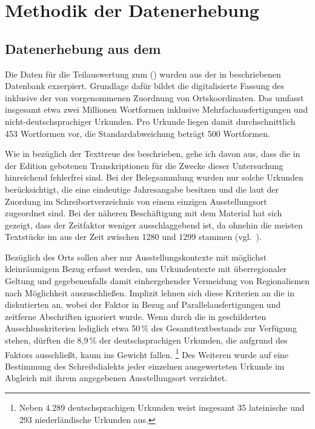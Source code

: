 \chapter{Methodik der Datenerhebung}
\label{ch:methoden}

\section%
	{Datenerhebung aus dem }
\label{sec:miningcao}

Die Daten für die Teilauswertung zum  (\CAO) wurden aus der in
\textcites[207]{beckerschallert2021}[155--158]{beckerschallert2022b}
beschriebenen Datenbank exzerpiert. Grundlage dafür bildet die digitalisierte
Fassung des \CAO{} \autocites{cao-online}[vgl.~dazu][]{gniffkerapp2005}
inklusive der von \citeauthor{beckerschallert2022b} vorgenommenen Zuordnung von
Ortskoordinaten. Das \CAO{} umfasst insgesamt etwa zwei Millionen Wortformen
inklusive Mehrfachausfertigungen und nicht-deutschsprachiger Urkunden. Pro
Urkunde liegen damit durchschnittlich 453 Wortformen vor, die
Standardabweichung beträgt 500 Wortformen.

Wie in  bezüglich der Text\-treue des \CAO{} beschrieben,
gehe ich davon aus, dass die in der Edition gebotenen Transkriptionen für die
Zwecke dieser Untersuchung hinreichend fehlerfrei sind. Bei der Belegsammlung
wurden nur solche Urkunden berücksichtigt, die eine eindeutige Jahresangabe
besitzen und die laut der Zuordung im Schreibortverzeichnis von
\citet{cao-online} einem einzigen Ausstellungsort zugeordnet sind. Bei der
näheren Beschäftigung mit dem Material hat sich gezeigt, dass der Zeitfaktor
weniger ausschlaggebend ist, da ohnehin die meisten Textstücke im \CAO{} aus
der Zeit zwischen 1280 und 1299 stammen (vgl.~).

Bezüglich des Orts sollen aber nur Ausstellungs\-kontexte mit möglichst
kleinräumigem Bezug erfasst werden, um Urkundentexte mit überregionaler Geltung
und gegebenenfalls damit einhergehender Vermeidung von Regionalismen nach
Möglichkeit auszuschließen. Implizit lehnen sich diese Kriterien an die in
\citet[41--42]{ganslmayer2012} diskutierten an, wobei der Faktor  in
Bezug auf Parallelausfertigungen und zeitferne Abschriften ignoriert wurde.
Wenn durch die in \citet[155--158]{beckerschallert2022b} geschilderten
Ausschlusskriterien lediglich etwa 50\,\% des Gesamttextbestands zur Verfügung
stehen, dürften die 8,9\,\% der deutschsprachigen Urkunden, die
\citeauthor{ganslmayer2012} aufgrund des Faktors  ausschließt, kaum ins
Gewicht fallen.%
%
	\footnote{Neben 4.289 deutschsprachigen Urkunden weist
		\citet[41]{ganslmayer2012} insgesamt 35 lateinische und 293
		niederländische Urkunden aus.}
%
Des Weiteren wurde auf eine Bestimmung des Schreibdialekts jeder einzelnen
ausgewerteten Urkunde im Abgleich mit ihrem angegebenen Ausstellungsort
verzichtet.


